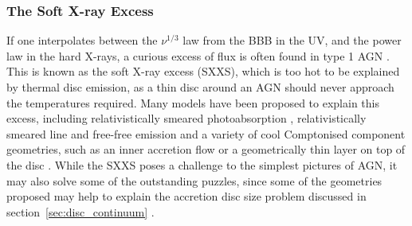 \subsubsection{The Soft X-ray Excess}
\label{sec:sxxs}

If one interpolates between the $\nu^{1/3}$ law from the BBB in the UV, and the power law
in the hard X-rays, a curious excess of flux is often found
in type 1 AGN \citep[see Fig.~\ref{fig:quasar_sed}, and][]{koratkar1999}. 
This is known as the soft X-ray excess (SXXS), which is too 
hot to be explained by thermal disc emission, as a thin disc around an AGN should
never approach the temperatures required. Many models have been proposed to
explain this excess, including relativistically smeared 
photoabsorption \citep{gierlinskidone2004b,gierlinskidone2006}, 
relativistically smeared line and 
free-free emission \citep{rossfabian2005,crummy2006} 
and a variety of cool Comptonised component geometries, such as an 
inner accretion flow \citep{magdiarz1998,done2012} 
or a geometrically thin layer on top of the disc \citep{januik2001}. 
While the SXXS poses a challenge to
the simplest pictures of AGN, it may also solve some of the outstanding puzzles, 
since some of the geometries proposed may help to explain the 
accretion disc size problem discussed in 
section~\ref{sec:disc_continuum} \citep{gardnerdone2016}.

